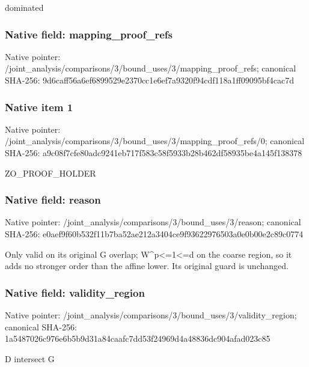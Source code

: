 \documentclass[10pt,a4paper]{article}
\begin{document}
\begingroup\raggedright\sloppy dominated\par\endgroup

\subsubsection{Native field: mapping\_\allowbreak{}proof\_\allowbreak{}refs}
Native pointer: /joint\_\allowbreak{}analysis/comparisons/3/bound\_\allowbreak{}uses/3/mapping\_\allowbreak{}proof\_\allowbreak{}refs; canonical SHA-256: 9d6caff56a6ef6899529e2370cc1e6ef7a9320f94cdf118a1ff09095bf4cac7d

\subsubsection{Native item 1}
Native pointer: /joint\_\allowbreak{}analysis/comparisons/3/bound\_\allowbreak{}uses/3/mapping\_\allowbreak{}proof\_\allowbreak{}refs/0; canonical SHA-256: a9c08f7cfe80adc9241eb717f583c58f5933b28b462df58935be4a145f138378

\begingroup\raggedright\sloppy ZO\_\allowbreak{}PROOF\_\allowbreak{}HOLDER\par\endgroup

\subsubsection{Native field: reason}
Native pointer: /joint\_\allowbreak{}analysis/comparisons/3/bound\_\allowbreak{}uses/3/reason; canonical SHA-256: e0aef9f60b532f11b7ba52ae212a3404ce9f93622976503a0e0b00e2c89c0774

\begingroup\raggedright\sloppy Only valid on its original G overlap;\allowbreak{} W\textasciicircum{}p<=\allowbreak{}1<=\allowbreak{}d on the coarse region,\allowbreak{} so it adds no stronger order than the affine lower. Its original guard is unchanged.\par\endgroup

\subsubsection{Native field: validity\_\allowbreak{}region}
Native pointer: /joint\_\allowbreak{}analysis/comparisons/3/bound\_\allowbreak{}uses/3/validity\_\allowbreak{}region; canonical SHA-256: 1a5487026c976e6b5b9d31a84caafc7dd53f24969d4a48836dc904afad023c85

\begingroup\raggedright\sloppy D intersect G\par\endgroup
\end{document}
